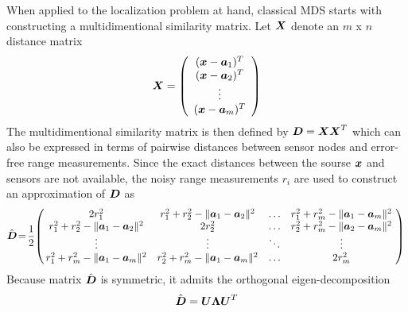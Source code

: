 
When applied to the localization problem at hand, classical MDS starts with constructing a multidimentional similarity matrix. Let $\mbox{\boldmath$X$}$ denote  an $m$ x $n$ distance matrix 
\begin{equation}
\nonumber
\begin{aligned}
\mbox{\boldmath$X$} = \left( \begin{array}{c}
(\mbox{\boldmath$x$} - \mbox{\boldmath$a$}_1)^T \\
(\mbox{\boldmath$x$} - \mbox{\boldmath$a$}_2)^T \\
\vdots \\
(\mbox{\boldmath$x$} - \mbox{\boldmath$a$}_m)^T
\end{array}
\right) 
\\
\end{aligned}
\end{equation}
The multidimentional similarity matrix is then defined by $\mbox{\boldmath$D$} = \mbox{\boldmath$X$}\mbox{\boldmath$X$}^T$ which can also be expressed in terms of pairwise distances between sensor nodes and error-free range measurements. Since the exact distances between the sourse $\mbox{\boldmath$x$}$ and sensors are not available, the noisy range measurements $r_i$ are used to construct an approximation of $\mbox{\boldmath$D$}$ as %
\begin{equation}
\nonumber
\hat{\mbox{\boldmath$D$}}\!=\!\frac{1}{2}\!\left(\!\!\begin{array}{cccc}
2r_1^2 & r_1^2 + r_2^2 - \|\mbox{\boldmath$a$}_1 - \mbox{\boldmath$a$}_2\|^2 & \ldots & r_1^2 + r_m^2 - \|\mbox{\boldmath$a$}_1 - \mbox{\boldmath$a$}_m\|^2\\
r_1^2 + r_2^2 - \|\mbox{\boldmath$a$}_1 - \mbox{\boldmath$a$}_2\|^2 & 2 r_2^2 & \ldots & r_2^2 + r_m^2 - \|\mbox{\boldmath$a$}_2 - \mbox{\boldmath$a$}_m\|^2\\
\vdots & \vdots & \ddots & \vdots \\
r_1^2 + r_m^2 - \|\mbox{\boldmath$a$}_1 - \mbox{\boldmath$a$}_m\|^2 & r_2^2 + r_m^2 - \|\mbox{\boldmath$a$}_1 - \mbox{\boldmath$a$}_m\|^2 & \ldots & 2r_m^2\end{array}\!\right) \\
\end{equation}
Because matrix $\hat{\mbox{\boldmath$D$}}$ is symmetric, it admits the orthogonal eigen-decomposition
\begin{equation}
\nonumber
\hat{\mbox{\boldmath$D$}} = \mbox{\boldmath$U$}\mbox{\boldmath{$\Lambda$}}\mbox{\boldmath$U$}^T
\end{equation}
